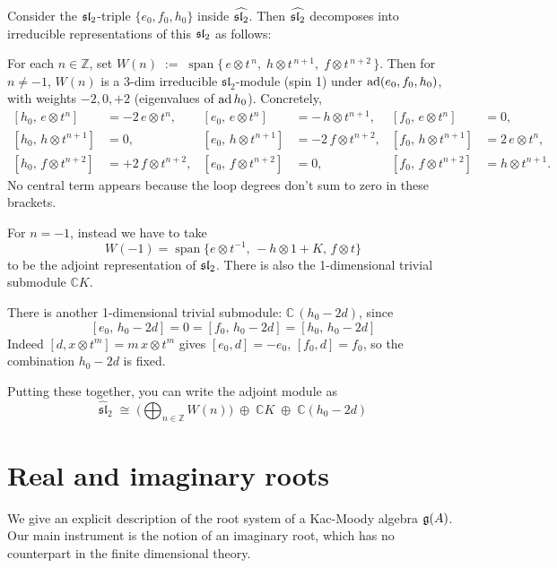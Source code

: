 \documentclass[12pt]{article}
\begin{document}
\begin{example}
     Consider the $\sl_2$-triple $\{e_0,f_0,h_0\}$ inside $\widehat{\sl_2}$. Then $\widehat{\sl_2}$ decomposes into irreducible representations of this $\sl_2$ as follows:

        For each $n\in\mathbb{Z}$, set
    $W(n)\;:=\;\operatorname{span}\{\,e\otimes t^{\,n},\;h\otimes t^{\,n+1},\;f\otimes t^{\,n+2}\,\}$.
    Then for $n\neq -1$, $W(n)$ is a 3-dim irreducible $\mathfrak{sl}_2$-module (spin 1) under $\ad(e_0,f_0,h_0)$, with weights $-2,0,+2$ (eigenvalues of $\ad h_0$). Concretely,
    \[
    \begin{aligned}
    [h_0,\,e\otimes t^n]&=-2\,e\otimes t^n, & [e_0,\,e\otimes t^n]&=-\,h\otimes t^{n+1}, & [f_0,\,e\otimes t^n]&=0,\\
    [h_0,\,h\otimes t^{n+1}]&=0, & [e_0,\,h\otimes t^{n+1}]&=-2\,f\otimes t^{n+2}, & [f_0,\,h\otimes t^{n+1}]&=2\,e\otimes t^{n},\\
    [h_0,\,f\otimes t^{n+2}]&=+2\,f\otimes t^{n+2}, & [e_0,\,f\otimes t^{n+2}]&=0, & [f_0,\,f\otimes t^{n+2}]&=h\otimes t^{n+1}.
    \end{aligned}
    \]
    No central term appears because the loop degrees don't sum to zero in these brackets.

    For $n=-1$, instead we have to take \[W(-1)=\operatorname{span}\{e\otimes t^{-1},\, -h\otimes 1 + K,\,f\otimes t\}\] to be the adjoint representation of $\sl_2$. There is also the 1-dimensional trivial submodule $\mathbb{C}K$.

    There is another 1-dimensional trivial submodule:
    $\mathbb{C}\,(h_0-2d)$,
    since \[[e_0,\,h_0-2d]=0=[f_0,\,h_0-2d]=[h_0,\,h_0-2d]\]
    Indeed $[d, x\otimes t^m]=m\,x\otimes t^m$ gives $[e_0,d]=-e_0$, $[f_0,d]=f_0$, so the combination $h_0-2d$ is fixed.

    Putting these together, you can write the adjoint module as
    \[
    \widehat{\mathfrak{sl}}_2
    \;\cong\;
    \Big(\bigoplus_{n\in\mathbb{Z}} W(n)\Big)
    \;\oplus\; \mathbb{C}K
    \;\oplus\; \mathbb{C}(h_0-2d)\]
\end{example}

\section{Real and imaginary roots}
We give an explicit description of the root system of a Kac-Moody algebra $\mf g(A)$. Our main instrument is the notion of an imaginary root, which has no counterpart in the finite dimensional theory.
\end{document}
